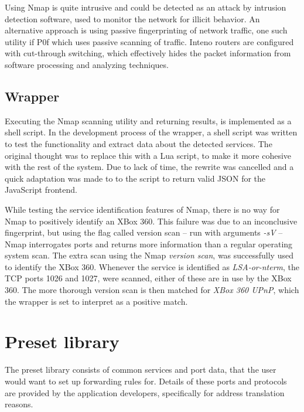 \documentclass[a4paper,11pt]{kth-bcs}
\begin{document}
Using Nmap is quite intrusive and could be detected as an attack by intrusion detection software, used to monitor the network for illicit behavior.
An alternative approach is using passive fingerprinting of network traffic, one such utility if P0f which uses passive scanning of traffic.\cite{p0f}
Inteno routers are configured with cut-through switching, which effectively hides the packet information from software processing and analyzing techniques.

\subsection{Wrapper}
Executing the Nmap scanning utility and returning results, is implemented as a shell script.
In the development process of the wrapper, a shell script was written to test the functionality and extract data about the detected services.
The original thought was to replace this with a Lua script, to make it more cohesive with the rest of the system.
Due to lack of time, the rewrite was cancelled and a quick adaptation was made to to the script to return valid JSON for the JavaScript frontend.

While testing the service identification features of Nmap, there is no way for Nmap to positively identify an XBox 360.
This failure was due to an inconclusive fingerprint, but using the flag called version scan -- run with arguments \emph{-sV} -- Nmap interrogates ports and returns more information than a regular operating system scan.
The extra scan using the Nmap \emph{version scan}, was successfully used to identify the XBox 360.
Whenever the service is identified as \emph{LSA-or-nterm}, the TCP ports 1026 and 1027, were scanned, either of these are in use by the XBox 360.\cite{aretheysecure}
The more thorough version scan is then matched for \emph{XBox 360 UPnP}, which the wrapper is set to interpret as a positive match.

\section{Preset library}
The preset library consists of common services and port data, that the user would want to set up forwarding rules for.
Details of these ports and protocols are provided by the application developers, specifically for address translation reasons.
\end{document}
